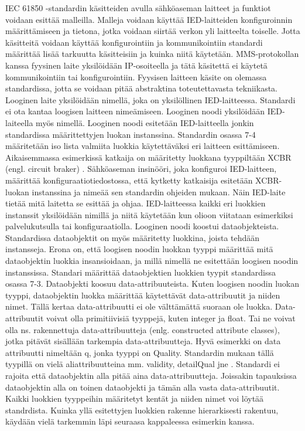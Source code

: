 IEC 61850 -standardin käsitteiden avulla sähköaseman laitteet ja funktiot voidaan esittää malleilla. Malleja voidaan käyttää IED-laitteiden konfiguroinnin määrittämiseen ja tietona, jotka voidaan siirtää verkon yli laitteelta toiselle. Jotta käsitteitä voidaan käyttää konfigurointiin ja kommunikointiin standardi määrittää lisää tarkuutta käsitteisiin ja kuinka niitä käytetään. MMS-protokollan kanssa fyysinen laite yksilöidään IP-osoiteella ja tätä käsitettä ei käytetä kommunikointiin tai konfigurointiin. Fyysisen laitteen käsite on olemassa standardissa, jotta se voidaan pitää abstraktina toteutettavasta tekniikasta. Looginen laite yksilöidään nimellä, joka on yksilöllinen IED-laitteessa. Standardi ei ota kantaa loogisen laitteen nimeämiseen. Looginen noodi yksilöidään IED-laiteella myös nimellä. Looginen noodi esitetään IED-laitteella jonkin standardissa määrittettyjen luokan instanssina. Standardin osassa 7-4 määritetään iso lista valmiita luokkia käytettäväksi eri laitteen esittämiseen. Aikaisemmassa esimerkissä katkaija on määritetty luokkana tyyppiltään XCBR (engl. circuit braker) \cite[s.~105--106]{IEC61850-7-4}. Sähköaseman insinööri, joka konfiguroi IED-laitteen, määrittää konfiguraatiotiedostossa, että kytketty katkaisija esitetään XCBR-luokan instanssina ja nimeää sen standardin ohjeiden mukaan. Näin IED-laite tietää mitä laitetta se esittää ja ohjaa. IED-laitteessa kaikki eri luokkien instanssit yksilöidään nimillä ja niitä käytetään kun olioon viitataan esimerkiksi palvelukutsulla tai konfiguraatiolla. Looginen noodi koostui dataobjekteista. Standardissa dataobjektit on myös määritetty luokkina, joista tehdään instansseja. Erona on, että loogisen noodin luokkan tyyppi määrittää mitä dataobjektin luokkia insansioidaan, ja millä nimellä ne esitettään loogisen noodin instanssissa. Standari määrittää dataobjektien luokkien tyypit standardissa osassa 7-3. Dataobjekti koosuu data-attribuuteista. Kuten loogisen noodin luokan tyyppi, dataobjektin luokka määrittää käytettävät data-attribuutit ja niiden nimet. Tällä kertaa data-attribuutti ei ole välttämättä suoraan ole luokka. Data-attribuutit voivat olla primitiivisiä tyyppejä, kuten integer ja float. Tai ne voivat olla ns. rakennettuja data-attribuutteja (enlg. constructed attribute classes), jotka pitävät sisällään tarkempia data-attribuutteja. Hyvä esimerkki on data attribuutti nimeltään q, jonka tyyppi on Quality. Standardin mukaan tällä tyypillä on vielä aliattribuutteina mm. validity, detailQual jne \cite[s.~11]{IEC61850-7-3}. Standardi ei rajoita että dataobjektin alla pitää aina data-attribuutteja. Joissakin tapauksissa dataobjektin alla on toinen dataobjekti ja tämän alla vasta data-attribuutit. Kaikki luokkien tyyppeihin määritetyt kentät ja niiden nimet voi löytää standrdista. Kuinka yllä esitettyjen luokkien rakenne hierarkisesti rakentuu, käydään vielä tarkemmin läpi seuraasa kappaleessa esimerkin kanssa. \cite{IEC61850-1, IEC61850-7-1, IEC61850-7-2, IEC61850-7-3}


